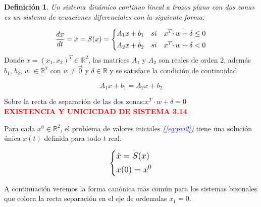 \documentclass[12pt,a4paper]{report} %
\newtheorem{definicion}{Definición}[chapter] %
\newcommand{\eref}[1]{\hyperref[#1]{\textcolor{blue}{\textit{(\ref*{#1})}}}}
\begin{document}
	\begin{definicion}
		Un sistema dinámico continuo lineal a trozos plano con dos zonas es un sistema de ecuaciones diferenciales con la siguiente forma:
	\end{definicion}
	
	\begin{equation}
		\frac{dx}{dt}=\dot{x}=S(x)=
		\label{eq:biz1}
		\scalebox{1}{$\displaystyle
			\left\{
			\begin{aligned}
			 A_1x+b_1\quad si \quad x^T\cdotp w+\delta \leq 0 \\
			 A_2x+b_2\quad si \quad x^T\cdotp w+\delta < 0
			\end{aligned}
			\right.
			$}
	\end{equation}\smallskip
	Donde $x=(x_1,x_2)^T\in \mathbb{R}^2$, las matrices $A_1$ y $A_2$ son reales de orden $2$, además\\ $b_1$, $b_2$, $w$ $\in \mathbb{R}^2$ con $w\neq\vec{0}$ y $\delta \in \mathbb{R}$ y se satisface la condición de continuidad
	
	\begin{equation}
		A_1x+b_1=A_2x+b_2 
	\end{equation}\smallskip
	
	Sobre la recta de separación de las dos zonas:\quad $x^T\cdotp w+\delta = 0$ \\[0.5cm]
	
	\textbf{\textcolor{red}{EXISTENCIA Y UNICICDAD DE SISTEMA 3.14}}

	Para cada $x^0 \in \mathbb{R}^2$, el problema de valores iniciales \eref{eq:pvi2} tiene una solución única $x(t)$ definida para todo $t$ real.
	
	\begin{equation}
		\label{eq:pvi2}
		\scalebox{1.2}{$\displaystyle
			\left\{
			\begin{aligned}
				&\dot{x}=S(x)\\
				&x(0)=x^0
			\end{aligned}
			\right.
			$}
	\end{equation}\smallskip
	
	 A continuación veremos la forma canónica mas común para los sistemas bizonales que coloca la recta separación en el eje de ordenadas $x_1=0$.
	
\end{document}
